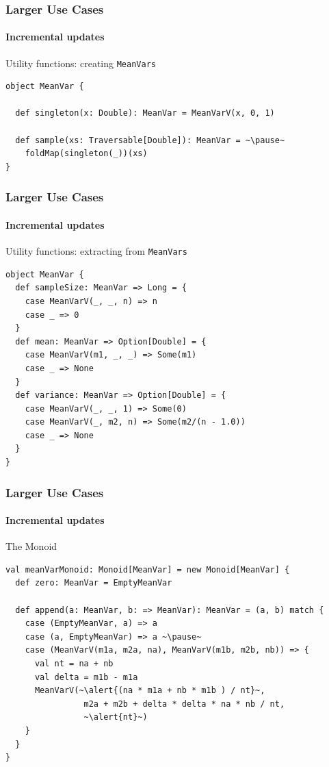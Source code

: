 \documentclass{beamer}
\begin{document}
\begin{frame}[fragile]
  \frametitle{Larger Use Cases}
  \framesubtitle{Incremental updates}
  \begin{block}{Utility functions: creating \texttt{MeanVars}}
  \begin{lstlisting}
object MeanVar {

  def singleton(x: Double): MeanVar = MeanVarV(x, 0, 1)

  def sample(xs: Traversable[Double]): MeanVar = ~\pause~
    foldMap(singleton(_))(xs)
}
  \end{lstlisting}
  \end{block}
\end{frame}

\begin{frame}[fragile]
  \frametitle{Larger Use Cases}
  \framesubtitle{Incremental updates}
  \begin{block}{Utility functions: extracting from \texttt{MeanVars}}
  \begin{lstlisting}
object MeanVar {
  def sampleSize: MeanVar => Long = {
    case MeanVarV(_, _, n) => n
    case _ => 0
  }
  def mean: MeanVar => Option[Double] = {
    case MeanVarV(m1, _, _) => Some(m1)
    case _ => None
  }
  def variance: MeanVar => Option[Double] = {
    case MeanVarV(_, _, 1) => Some(0)
    case MeanVarV(_, m2, n) => Some(m2/(n - 1.0))
    case _ => None
  }
}
  \end{lstlisting}
  \end{block}
\end{frame}

\begin{frame}[fragile]
  \frametitle{Larger Use Cases}
  \framesubtitle{Incremental updates}
  \begin{block}{The Monoid}
  \begin{lstlisting}
val meanVarMonoid: Monoid[MeanVar] = new Monoid[MeanVar] {
  def zero: MeanVar = EmptyMeanVar

  def append(a: MeanVar, b: => MeanVar): MeanVar = (a, b) match {
    case (EmptyMeanVar, a) => a
    case (a, EmptyMeanVar) => a ~\pause~
    case (MeanVarV(m1a, m2a, na), MeanVarV(m1b, m2b, nb)) => {
      val nt = na + nb
      val delta = m1b - m1a
      MeanVarV(~\alert{(na * m1a + nb * m1b ) / nt}~,
                m2a + m2b + delta * delta * na * nb / nt,
                ~\alert{nt}~)
    }
  }
}
  \end{lstlisting}
  \end{block}
\end{frame}
\end{document}
